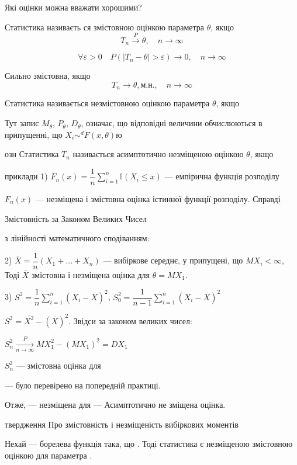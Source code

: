Які оцінки можна вважати хорошими?

\begin{definition}
    Статистика  називаєть ся змістовною оцінкою параметра $\theta$, якщо 
    $$T_n \xrightarrow{P} \theta, \quad n \rightarrow \infty$$

    $$\forall \varepsilon > 0 \quad P(|T_n - \theta|>\varepsilon) \rightarrow 0, \quad n \rightarrow\infty$$
\end{definition}

Сильно змістовна, якщо 
$$T_n \rightarrow \theta, \text{м.н.} , \quad n \rightarrow \infty$$


Статистика  називається незмістовною оцінкою параметра $\theta$, якщо 


Тут запис $M_{\theta}$, $P_{\theta}$, $D_{\theta}$, означає, що відповідні величини
обчислюються в припущенні, що $X_i \sim^d F(x, \theta)$ю

озн
Статистика $T_n$ називається асимптотично незміщеною оцінкою $\theta$,
якщо 


приклади
1)
$F_n(x) = \dfrac{1}{n} \sum\limits_{i=1}^n \mathbb{I}(X_i \leqslant x)$ --- емпірична функція розподілу

$F_n(x)$ --- незміщена і змістовна оцінка істинної функції розподілу. Справді

Змістовність за Законом Великих Чисел

з лінійності математичного сподіванням:


2) 
$\overline{X} = \dfrac{1}{n} (X_1 + ... + X_n)$ --- вибіркове середнє, у припущені, що $MX_i < \infty$,
Тоді $\overline{X}$ змістовна і незміщена оцінка для $\theta = MX_1$.

3) $S^2 = \dfrac{1}{n} \sum\limits_{i=1}^{n} (X_i - \overline{X})^2$,
$S_0^2 = \dfrac{1}{n-1} \sum\limits_{i=1}^{n} (X_i - \overline{X})^2$

$S^2 = \overline{X^2} - (\overline{X})^2$. Звідси за законом великих чисел:

$S_n^2 \xrightarrow[n \rightarrow \infty]{P} MX_1^2 - (MX_1)^2 = DX_1$

$S_n^2$ --- змістовна оцінка для 

--- було перевірено на попередній практиці.


Отже, --- незміщена для 
--- Асимптотично не зміщена оцінка.

твердження
Про змістовність і незміщеність вибіркових моментів

Нехай  --- борелева функція така, що .
Тоді статистика
є незміщеною змістовною оцінкою для параметра .


